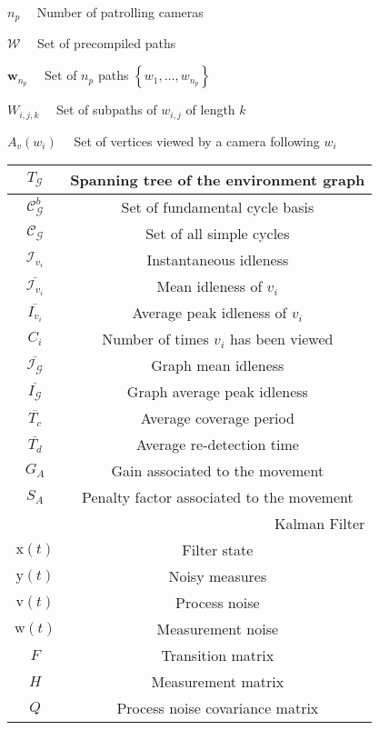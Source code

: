 \documentclass[conference]{IEEEtran}
\begin{document}
$n_{p} \quad$ Number of patrolling cameras

$\mathcal{W} \quad$ Set of precompiled paths

$\mathbf{w}_{n_{p}} \quad$ Set of $n_{p}$ paths $\left\{w_{1}, \ldots, w_{n_{p}}\right\}$

$W_{i, j, k} \quad$ Set of subpaths of $w_{i, j}$ of length $k$

$A_{v}\left(w_{i}\right) \quad$ Set of vertices viewed by a camera following $w_{i}$

\begin{center}
\begin{tabular}{|c|c|}
\hline
$T_{\mathcal{G}}$ & Spanning tree of the environment graph \\
\hline
$\mathcal{C}_{\mathcal{G}}^{b}$ & Set of fundamental cycle basis \\
\hline
$\mathcal{C}_{\mathcal{G}}$ & Set of all simple cycles \\
\hline
$\mathcal{I}_{v_{i}}$ & Instantaneous idleness \\
\hline
$\overline{\mathcal{I}_{v_{i}}}$ & Mean idleness of $v_{i}$ \\
\hline
$\overline{I_{v_{i}}}$ & Average peak idleness of $v_{i}$ \\
\hline
$C_{i}$ & Number of times $v_{i}$ has been viewed \\
\hline
$\overline{\mathcal{I}_{\mathcal{G}}}$ & Graph mean idleness \\
\hline
$\overline{I_{\mathcal{G}}}$ & Graph average peak idleness \\
\hline
$\overline{T_{c}}$ & Average coverage period \\
\hline
$\overline{T_{d}}$ & Average re-detection time \\
\hline
$G_{A}$ & Gain associated to the movement \\
\hline
$S_{A}$ & Penalty factor associated to the movement \\
\hline
\multicolumn{2}{|r|}{Kalman Filter} \\
\hline
$\mathrm{x}(t)$ & Filter state \\
\hline
$\mathrm{y}(t)$ & Noisy measures \\
\hline
$\mathrm{v}(t)$ & Process noise \\
\hline
$\mathrm{w}(t)$ & Measurement noise \\
\hline
$F$ & Transition matrix \\
\hline
$H$ & Measurement matrix \\
\hline
$Q$ & Process noise covariance matrix \\

\end{tabular}
\end{center}
\end{document}
